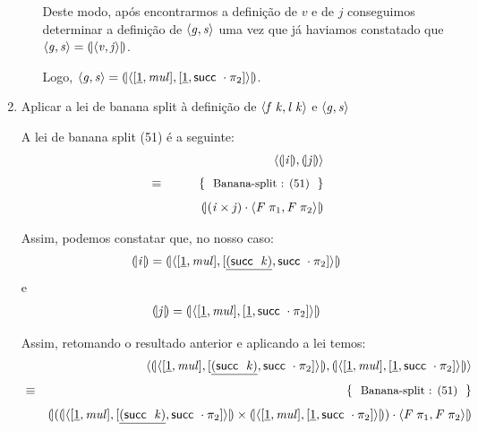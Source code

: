 \documentclass[a4paper]{article}
\newcommand{\Conid}[1]{\mathit{#1}}
\newcommand{\Varid}[1]{\mathit{#1}}
\begin{document}
\begin{enumerate}
\begin{enumerate}
\vspace{0.5cm}

Deste modo, após encontrarmos a definição de \ensuremath{\Varid{v}} e de \ensuremath{\Varid{j}} conseguimos determinar
a definição de \ensuremath{\conj{\Varid{g}}{\Varid{s}}} uma vez que já haviamos constatado que
\ensuremath{\conj{\Varid{g}}{\Varid{s}}\mathrel{=}\cata{\conj{\Varid{v}}{\Varid{j}}}}.

Logo, \ensuremath{\conj{\Varid{g}}{\Varid{s}}\mathrel{=}\cata{\conj{\alt{\underline{\mathrm{1}}}{\Varid{mul}}}{\alt{\underline{\mathrm{1}}}{\succ \comp \p2}}}}.
\end{enumerate}


\item Aplicar a lei de banana split à definição de \ensuremath{\conj{\Varid{f}\;\Varid{k}}{\Varid{l}\;\Varid{k}}} e \ensuremath{\conj{\Varid{g}}{\Varid{s}}}

A lei de banana split (51) é a seguinte:
\begin{eqnarray*}
\start
\ensuremath{\conj{\cata{\Varid{i}}}{\cata{\Varid{j}}}}
%
\just\equiv{ Banana-split : (51) }
%
\ensuremath{\cata{(\Varid{i}\times\Varid{j})\comp \conj{\Conid{F}\;\p1}{\Conid{F}\;\p2}}}
%
\end{eqnarray*}

Assim, podemos constatar que, no nosso caso:
\begin{eqnarray*}
\ensuremath{\cata{\Varid{i}}\mathrel{=}\cata{\conj{\alt{\underline{\mathrm{1}}}{\Varid{mul}}}{\alt{\underline{(\succ \;\Varid{k})}}{\succ \comp \p2}}}}
\end{eqnarray*}
e
\begin{eqnarray*}
\ensuremath{\cata{\Varid{j}}\mathrel{=}\cata{\conj{\alt{\underline{\mathrm{1}}}{\Varid{mul}}}{\alt{\underline{\mathrm{1}}}{\succ \comp \p2}}}}
\end{eqnarray*}


Assim, retomando o resultado anterior e aplicando a lei temos:
\begin{eqnarray*}
\start
\ensuremath{\conj{\cata{\conj{\alt{\underline{\mathrm{1}}}{\Varid{mul}}}{\alt{\underline{(\succ \;\Varid{k})}}{\succ \comp \p2}}}}{\cata{\conj{\alt{\underline{\mathrm{1}}}{\Varid{mul}}}{\alt{\underline{\mathrm{1}}}{\succ \comp \p2}}}}}
%
\just\equiv{ Banana-split : (51) }
%
\ensuremath{\cata{(\cata{\conj{\alt{\underline{\mathrm{1}}}{\Varid{mul}}}{\alt{\underline{(\succ \;\Varid{k})}}{\succ \comp \p2}}}\times\cata{\conj{\alt{\underline{\mathrm{1}}}{\Varid{mul}}}{\alt{\underline{\mathrm{1}}}{\succ \comp \p2}}})\comp \conj{\Conid{F}\;\p1}{\Conid{F}\;\p2}}}
%
\end{eqnarray*}


\end{enumerate}
\end{document}
